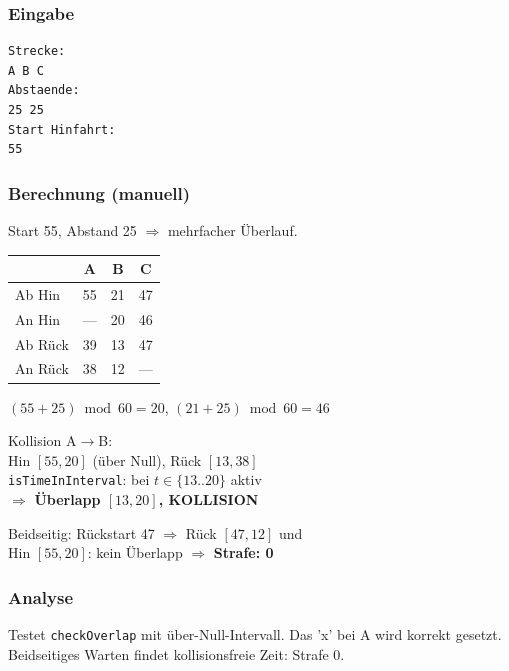 \documentclass[12pt,a4paper]{article}
\begin{document}
\noindent
\begin{minipage}[t]{0.48\textwidth}
\scriptsize
\setlength{\tabcolsep}{2pt}

\subsubsection*{Eingabe}
\begin{lstlisting}
Strecke:
A B C
Abstaende:
25 25
Start Hinfahrt:
55
\end{lstlisting}

\subsubsection*{Berechnung (manuell)}
Start 55, Abstand 25 $\Rightarrow$ mehrfacher Überlauf.\\[2pt]
\begin{tabular}{l|ccc}
\toprule
 & A & B & C\\
\midrule
Ab Hin  & 55 & 21 & 47\\
An Hin  & —  & 20 & 46\\
Ab Rück & 39 & 13 & 47\\
An Rück & 38 & 12 & —\\
\bottomrule
\end{tabular}

\vspace{4pt}
$(55+25)\bmod 60 = 20$, $(21+25)\bmod 60 = 46$

\vspace{4pt}
Kollision A$\to$B:\\
Hin $[55,20]$ (über Null), Rück $[13,38]$\\
\texttt{isTimeInInterval}: bei $t \in \{13..20\}$ aktiv\\
$\Rightarrow$ \textbf{Überlapp $[13,20]$, KOLLISION}

\vspace{4pt}
Beidseitig: Rückstart 47 $\Rightarrow$ Rück $[47,12]$ und\\
Hin $[55,20]$: kein Überlapp $\Rightarrow$ \textbf{Strafe: 0}

\subsubsection*{Analyse}
Testet \texttt{checkOverlap} mit über-Null-Intervall.
Das 'x' bei A wird korrekt gesetzt.
Beidseitiges Warten findet kollisionsfreie Zeit: Strafe 0.
\end{minipage}
\hfill
\end{document}
